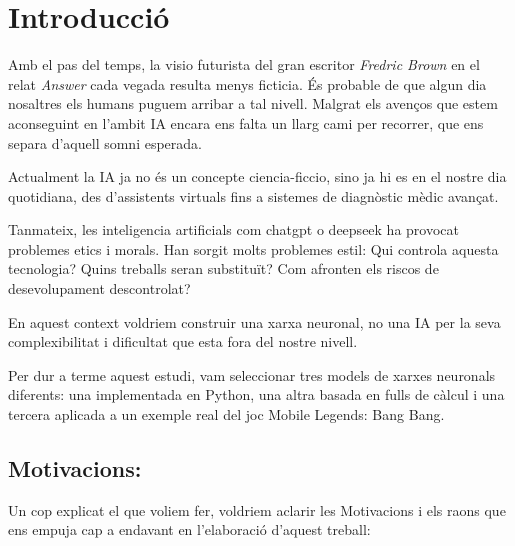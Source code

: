 \chapter{Introducció}
\label{c:intro}

Amb el pas del temps, la visio futurista del gran escritor \textit{Fredric Brown} en el relat \emph{Answer} cada vegada resulta menys ficticia. És probable de que algun dia nosaltres els humans puguem arribar a tal nivell. Malgrat els avenços que estem aconseguint en l'ambit IA encara ens falta un llarg cami per recorrer, que ens separa d'aquell somni esperada.

Actualment la IA ja no és un concepte ciencia-ficcio, sino ja hi es en el nostre dia quotidiana, des d’assistents virtuals fins a sistemes de diagnòstic mèdic avançat.

Tanmateix, les inteligencia artificials com chatgpt o deepseek ha provocat problemes etics i morals. Han sorgit molts problemes estil: Qui controla aquesta tecnologia? Quins treballs seran substituït? Com afronten els riscos de desevolupament descontrolat?

En aquest context voldriem construir una xarxa neuronal, no una IA per la seva complexibilitat i dificultat que esta fora del nostre nivell.

Per dur a terme aquest estudi, vam seleccionar tres models de xarxes neuronals diferents: una implementada en Python, una altra basada en fulls de càlcul i una tercera aplicada a un exemple real del joc Mobile Legends: Bang Bang.

\section{Motivacions:}
Un cop explicat el que voliem fer, voldriem aclarir les Motivacions i els raons que ens empuja cap a endavant en l'elaboració d'aquest treball:

